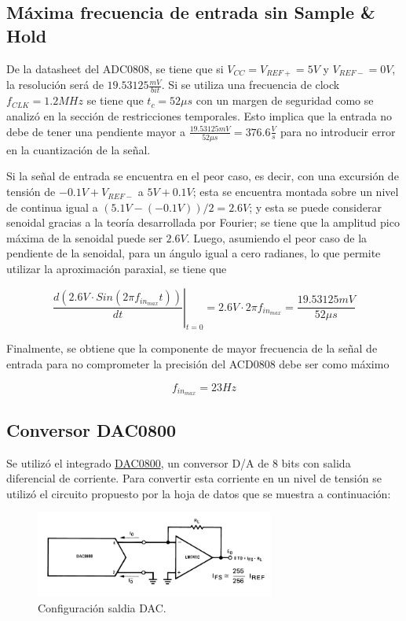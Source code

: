 \subsection{Máxima frecuencia de entrada sin Sample \& Hold}

De la datasheet del ADC0808, se tiene que si $V_{CC} = V_{REF+} = 5V$ y $V_{REF-} = 0V$, la resolución será de $19.53125 \frac{mV}{bit}$. Si se utiliza una frecuencia de clock $f_{CLK} = 1.2MHz$ se tiene que $t_{c} = 52\mu s$ con un margen de seguridad como se analizó en la sección de restricciones temporales. Esto implica que la entrada no debe de tener una pendiente mayor a $\frac{19.53125mV}{52\mu s} = 376.6\frac{V}{s}$ para no introducir error en la cuantización de la señal.

Si la señal de entrada se encuentra en el peor caso, es decir, con una excursión de tensión de $-0.1V + V_{REF-}$ a $5V + 0.1V$; esta se encuentra montada sobre un nivel de continua igual a $(5.1V - (-0.1V))/2 = 2.6V$; y esta se puede considerar senoidal gracias a la teoría desarrollada por Fourier; se tiene que la amplitud pico máxima de la senoidal puede ser $2.6V$. Luego, asumiendo el peor caso de la pendiente de la senoidal, para un ángulo igual a cero radianes, lo que permite utilizar la aproximación paraxial, se tiene que

\begin{equation}
\left. \frac{d \left( 2.6V \cdot Sin \left( 2\pi f_{in_{max}} t \right) \right)}{dt} \right|_{t=0} = 2.6V \cdot 2\pi f_{in_{max}} = \frac{19.53125mV}{52\mu s}
\end{equation}

Finalmente, se obtiene que la componente de mayor frecuencia de la señal de entrada para no comprometer la precisión del ACD0808 debe ser como máximo

$$f_{in_{max}} = 23Hz$$

\subsection{Conversor DAC0800}
Se utilizó el integrado \href{https://www.ti.com/lit/ds/symlink/dac0808.pdf?ts=1591879123116&ref_url=https://www.google.com/}{DAC0800}, un conversor D/A de 8 bits con salida diferencial de corriente.
Para convertir esta corriente en un nivel de tensión se utilizó el circuito propuesto por la hoja de datos que se muestra a continuación:
\begin{figure}[H]
	\centering
	\includegraphics[width=0.7\textwidth]{ImagenesEjercicio1/dacout.png}
\caption{Configuración saldia DAC.}
	\label{fig:dacout}
\end{figure}

